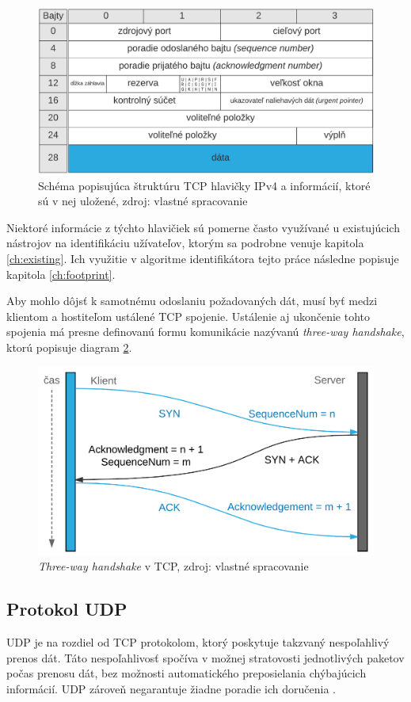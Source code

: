 \documentclass[
  printed, %
  table,   %
  lof,     %
  nolot,   %
  nocover
]{fithesis3}
\begin{document}
\begin{figure}[h]
  \centering
    \includegraphics[width=.95\textwidth]{images/net-tcp-head.png}
  \caption{Schéma popisujúca štruktúru TCP hlavičky IPv4 a informácií, ktoré sú v
  nej uložené, zdroj: vlastné spracovanie}
  \label{fig:net-tcp-head}
\end{figure}

Niektoré informácie z týchto hlavičiek sú pomerne často využívané u existujúcich
nástrojov na identifikáciu užívateľov, ktorým sa podrobne venuje kapitola
\ref{ch:existing}. Ich využitie v algoritme identifikátora tejto práce následne
popisuje kapitola \ref{ch:footprint}.

Aby mohlo dôjsť k samotnému odoslaniu požadovaných dát, musí byť medzi klientom
a hostiteľom ustálené TCP spojenie. Ustálenie aj ukončenie tohto spojenia má
presne definovanú formu komunikácie nazývanú \textit{three-way handshake}, ktorú
popisuje diagram \ref{fig:net-tcp-flow}.

\begin{figure}[h]
  \centering
    \includegraphics[width=.85\textwidth]{images/net-tcp-flow.png}
  \caption{\textit{Three-way handshake} v TCP, zdroj: vlastné spracovanie}
  \label{fig:net-tcp-flow}
\end{figure}

\subsection{Protokol UDP}
UDP je na rozdiel od TCP protokolom, ktorý poskytuje takzvaný nespoľahlivý
prenos dát. Táto nespoľahlivosť spočíva v možnej stratovosti jednotlivých
paketov počas prenosu dát, bez možnosti automatického preposielania chýbajúcich
informácií. UDP zároveň negarantuje žiadne poradie ich doručenia \cite{rfc1122}.
\end{document}
